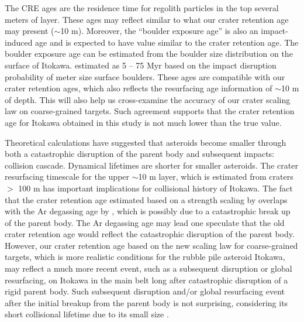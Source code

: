 \documentclass[3p,authoryear]{elsarticle}
\begin{document}
The CRE ages are the residence time for regolith particles in the top several meters of layer. These ages may reflect similar to what our crater retention age may present ($\sim$10 m). Moreover, the ``boulder exposure age'' is also an impact-induced age and is expected to have value similar to the crater retention age. The boulder exposure age can be estimated from the boulder size distribution on the surface of Itokawa. \citet{basilevsky2014} estimated as 5 -- 75 Myr based on the impact disruption probability of meter size surface boulders. These ages are compatible with our crater retention ages, which also reflects the resurfacing age information of $\sim$10 m of depth. This will also help us cross-examine the accuracy of our crater scaling law on coarse-grained targets. Such agreement supports that the crater retention age for Itokawa obtained in this study is not much lower than the true value.

Theoretical calculations have suggested that asteroids become smaller through both a catastrophic disruption of the parent body and subsequent impacts: collision cascade. Dynamical lifetimes are shorter for smaller asteroids. The crater resurfacing timescale for the upper $\sim$10 m layer, which is estimated from craters $>$ 100 m has important implications for collisional history of Itokawa. The fact that the crater retention age estimated based on a strength scaling by \citet{michel2009} overlaps with the Ar degassing age by \citet{park2015}, which is possibly due to a catastrophic break up of the parent body. The Ar degassing age may lead one speculate that the old crater retention age would reflect the catastrophic disruption of the parent body. However, our crater retention age based on the new scaling law for coarse-grained targets, which is more realistic conditions for the rubble pile asteroid Itokawa, may reflect a much more recent event, such as a subsequent disruption or global resurfacing, on Itokawa in the main belt long after catastrophic disruption of a rigid parent body. Such subsequent disruption and/or global resurfacing event after the initial breakup from the parent body is not surprising, considering its short collisional lifetime due to its small size \citep[e.g.,][]{obrien2005}.
\end{document}
